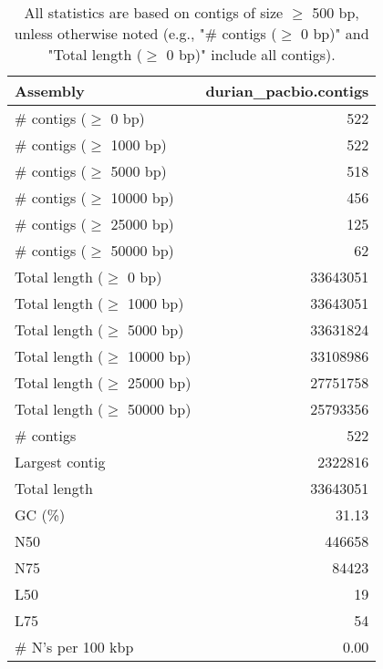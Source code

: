 \documentclass[12pt,a4paper]{article}
\begin{document}
\begin{table}[ht]
\begin{center}
\caption{All statistics are based on contigs of size $\geq$ 500 bp, unless otherwise noted (e.g., "\# contigs ($\geq$ 0 bp)" and "Total length ($\geq$ 0 bp)" include all contigs).}
\begin{tabular}{|l*{1}{|r}|}
\hline
Assembly & durian\_pacbio.contigs \\ \hline
\# contigs ($\geq$ 0 bp) & 522 \\ \hline
\# contigs ($\geq$ 1000 bp) & 522 \\ \hline
\# contigs ($\geq$ 5000 bp) & 518 \\ \hline
\# contigs ($\geq$ 10000 bp) & 456 \\ \hline
\# contigs ($\geq$ 25000 bp) & 125 \\ \hline
\# contigs ($\geq$ 50000 bp) & 62 \\ \hline
Total length ($\geq$ 0 bp) & 33643051 \\ \hline
Total length ($\geq$ 1000 bp) & 33643051 \\ \hline
Total length ($\geq$ 5000 bp) & 33631824 \\ \hline
Total length ($\geq$ 10000 bp) & 33108986 \\ \hline
Total length ($\geq$ 25000 bp) & 27751758 \\ \hline
Total length ($\geq$ 50000 bp) & 25793356 \\ \hline
\# contigs & 522 \\ \hline
Largest contig & 2322816 \\ \hline
Total length & 33643051 \\ \hline
GC (\%) & 31.13 \\ \hline
N50 & 446658 \\ \hline
N75 & 84423 \\ \hline
L50 & 19 \\ \hline
L75 & 54 \\ \hline
\# N's per 100 kbp & 0.00 \\ \hline
\end{tabular}
\end{center}
\end{table}
\end{document}
